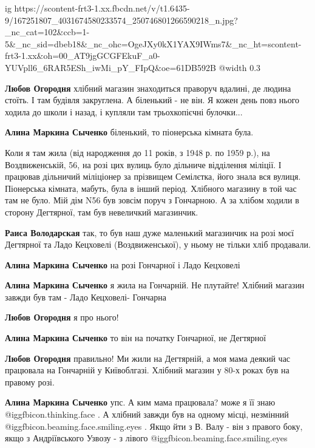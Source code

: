 \ifcmt
  ig https://scontent-frt3-1.xx.fbcdn.net/v/t1.6435-9/167251807_4031674580233574_250746801266590218_n.jpg?_nc_cat=102&ccb=1-5&_nc_sid=dbeb18&_nc_ohc=OgeJXy0kX1YAX9IWms7&_nc_ht=scontent-frt3-1.xx&oh=00_AT9jgGCGFEkuF_a0-YUVpll6_6RAR5ESh_iwMi_pY_FIpQ&oe=61DB592B
  @width 0.3
\fi

\textbf{Любов Огородня} хлібний магазин знаходиться праворуч вдалині, де людина стоїть. І там будівля закруглена. А біленький - не він.
Я кожен день повз нього ходила до школи і назад, і купляли там трьохкопієчні булочки...

\textbf{Алина Маркина Сыченко} біленький, то піонерська кімната була.


Коли я там жила (від народження до 11 років, з 1948 р. по 1959 р.), на
Воздвиженській, 56, на розі цих вулиць було дільниче відділення міліції. І
працював дільничий міліціонер за прізвищем Семілєтка, його знала вся вулиця.
Піонерська кімната, мабуть, була в інший період. Хлібного магазину в той час
там не було. Мій дім N56 був зовсім поруч з Гончарною. А за хлібом ходили в
сторону Дегтярної, там був невеличкий магазинчик.

\textbf{Раиса Володарская} так, то був наш дуже маленький магазинчик на розі моєї Дегтярної та Ладо Кецховелі (Воздвиженської), у ньому не тільки хліб продавали.

\textbf{Алина Маркина Сыченко} на розі Гончарної і Ладо Кецховелі

\textbf{Алина Маркина Сыченко} я жила на Гончарній. Не плутайте! Хлібний магазин завжди був там - Ладо Кецховелі- Гончарна

\textbf{Любов Огородня} я про нього!

\textbf{Алина Маркина Сыченко} то він на початку Гончарної, не Дегтярної

\textbf{Любов Огородня} правильно! Ми жили на Дегтярній, а моя мама деякий час працювала на Гончарній у Київоблгазі. Хлібний магазин у 80-х роках був на правому розі.

\textbf{Алина Маркина Сыченко} упс. А ким мама працювала? може я її знаю @igg{fbicon.thinking.face} . А хлібний завжди був на одному місці, незмінний @igg{fbicon.beaming.face.smiling.eyes} . Якщо йти з В. Валу - він з правого боку, якщо з Андріївського Узвозу - з лівого @igg{fbicon.beaming.face.smiling.eyes} 

